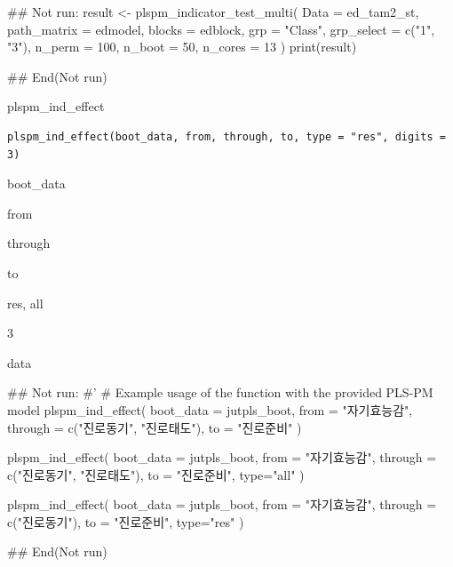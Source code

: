 \documentclass[a4paper]{book}
\begin{document}
%
\begin{Examples}
\begin{ExampleCode}
\#\# Not run: 
result <- plspm_indicator_test_multi(
  Data = ed_tam2_st,
  path_matrix = edmodel,
  blocks = edblock,
  grp = "Class",
  grp_select = c("1", "3"),
  n_perm = 100,
  n_boot = 50,
  n_cores = 13
)
print(result)

## End(Not run)
\end{ExampleCode}
\end{Examples}

%
\begin{Description}
plspm\_ind\_effect
\end{Description}
%
\begin{Usage}
\begin{verbatim}
plspm_ind_effect(boot_data, from, through, to, type = "res", digits = 3)
\end{verbatim}
\end{Usage}
%
\begin{Arguments}
\begin{ldescription}
\item[\code{boot\_data}] boot\_data

\item[\code{from}] from

\item[\code{through}] through

\item[\code{to}] to

\item[\code{type}] res, all

\item[\code{digits}] 3
\end{ldescription}
\end{Arguments}
%
\begin{Value}
data
\end{Value}
%
\begin{Examples}
\begin{ExampleCode}

\#\# Not run: 
#'
# Example usage of the function with the provided PLS-PM model
plspm_ind_effect(
  boot_data = jutpls_boot,
  from = "자기효능감",
  through = c("진로동기", "진로태도"),
  to = "진로준비"
)

plspm_ind_effect(
  boot_data = jutpls_boot,
  from = "자기효능감",
  through = c("진로동기", "진로태도"),
  to = "진로준비", type="all"
)

plspm_ind_effect(
  boot_data = jutpls_boot,
  from = "자기효능감",
  through = c("진로동기"),
  to = "진로준비", type="res"
)


## End(Not run)


\end{ExampleCode}
\end{Examples}
\end{document}
